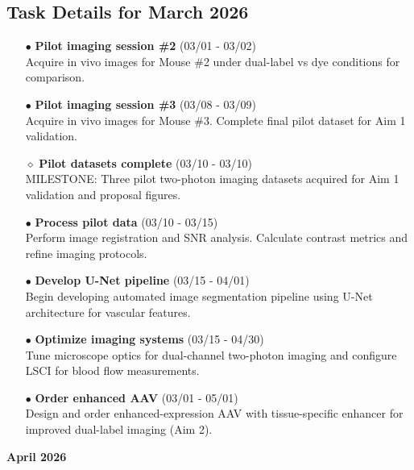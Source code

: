 \documentclass[landscape,a4paper]{article}
\begin{document}
\subsection{Task Details for March 2026}
\begin{itemize}[leftmargin=1cm]
    \item[\textcolor{other}{$\bullet$}] \textbf{Pilot imaging session \#2} (03/01 - 03/02)\\ Acquire in vivo images for Mouse \#2 under dual-label vs dye conditions for comparison.
    \item[\textcolor{other}{$\bullet$}] \textbf{Pilot imaging session \#3} (03/08 - 03/09)\\ Acquire in vivo images for Mouse \#3. Complete final pilot dataset for Aim 1 validation.
    \item[\textcolor{other}{$\diamond$}] \textbf{Pilot datasets complete} (03/10 - 03/10)\\ MILESTONE: Three pilot two-photon imaging datasets acquired for Aim 1 validation and proposal figures.
    \item[\textcolor{other}{$\bullet$}] \textbf{Process pilot data} (03/10 - 03/15)\\ Perform image registration and SNR analysis. Calculate contrast metrics and refine imaging protocols.
    \item[\textcolor{other}{$\bullet$}] \textbf{Develop U-Net pipeline} (03/15 - 04/01)\\ Begin developing automated image segmentation pipeline using U-Net architecture for vascular features.
    \item[\textcolor{other}{$\bullet$}] \textbf{Optimize imaging systems} (03/15 - 04/30)\\ Tune microscope optics for dual-channel two-photon imaging and configure LSCI for blood flow measurements.
    \item[\textcolor{other}{$\bullet$}] \textbf{Order enhanced AAV} (03/01 - 05/01)\\ Design and order enhanced-expression AAV with tissue-specific enhancer for improved dual-label imaging (Aim 2).
\end{itemize}

\newpage
\pagestyle{empty}

\begin{center}
{\large\textbf{April 2026}}
\end{center}

\vspace{0.5cm}
\end{document}
